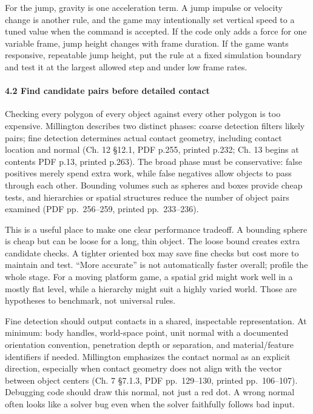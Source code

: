 For the jump, gravity is one acceleration term. A jump impulse or velocity change is another rule, and the game may intentionally set vertical speed to a tuned value when the command is accepted. If the code only adds a force for one variable frame, jump height changes with frame duration. If the game wants responsive, repeatable jump height, put the rule at a fixed simulation boundary and test it at the largest allowed step and under low frame rates.

\paragraph{4.2 Find candidate pairs before detailed contact}\label{06-engine-ii-ch033-find-candidate-pairs-before-detailed-contact}

Checking every polygon of every object against every other polygon is too expensive. Millington describes two distinct phases: coarse detection filters likely pairs; fine detection determines actual contact geometry, including contact location and normal (Ch. 12 §12.1, PDF p.255, printed p.232; Ch. 13 begins at contents PDF p.13, printed p.263). The broad phase must be conservative: false positives merely spend extra work, while false negatives allow objects to pass through each other. Bounding volumes such as spheres and boxes provide cheap tests, and hierarchies or spatial structures reduce the number of object pairs examined (PDF pp.~256--259, printed pp.~233--236).

This is a useful place to make one clear performance tradeoff. A bounding sphere is cheap but can be loose for a long, thin object. The loose bound creates extra candidate checks. A tighter oriented box may save fine checks but cost more to maintain and test. ``More accurate'' is not automatically faster overall; profile the whole stage. For a moving platform game, a spatial grid might work well in a mostly flat level, while a hierarchy might suit a highly varied world. Those are hypotheses to benchmark, not universal rules.

Fine detection should output contacts in a shared, inspectable representation. At minimum: body handles, world-space point, unit normal with a documented orientation convention, penetration depth or separation, and material/feature identifiers if needed. Millington emphasizes the contact normal as an explicit direction, especially when contact geometry does not align with the vector between object centers (Ch. 7 §7.1.3, PDF pp.~129--130, printed pp.~106--107). Debugging code should draw this normal, not just a red dot. A wrong normal often looks like a solver bug even when the solver faithfully follows bad input.

